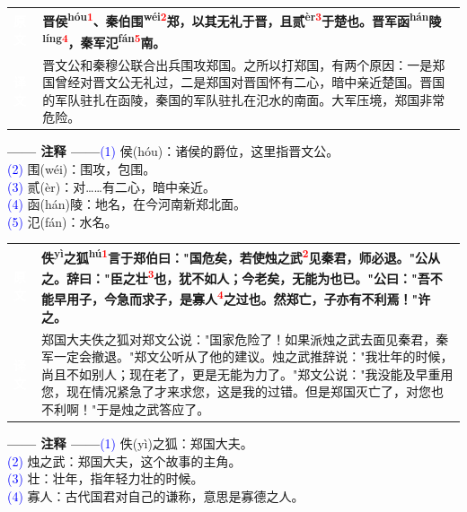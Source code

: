 \documentclass[a4paper,12pt]{ctexart}
\makeatletter
\newcommand{\ruby}[2]{#1\textsuperscript{#2}}
\newlength{\colA}\setlength{\colA}{0.06\textwidth}
\newlength{\colB}\setlength{\colB}{0.64\textwidth}
\newlength{\colC}\setlength{\colC}{0.26\textwidth}
\newcommand{\sectab}[3]{%
  \noindent
  \begin{minipage}[c]{\dimexpr\colA+\colB+2\tabcolsep\relax}
  \begin{tabular}{@{}p{\colA}p{\colB}@{}}
  \sideyuan  & {\large\bfseries #1} \\
  \sideyiwen & {\large #2} \\
  \end{tabular}
  \end{minipage}
  \hfill
  \begin{minipage}[c]{\colC}
  {\labelann\vspace{0.1cm}}#3
  \end{minipage}
  \par
}
\newcommand{\sideyuan}{\colorbox{blue!70!black}{\textcolor{white}{\normalsize\textbf{原文}}}}
\newcommand{\sideyiwen}{\colorbox{green!60!black}{\textcolor{white}{\normalsize\textbf{译文}}}}
\newcommand{\labelann}{\textcolor{orange!80!black}{\small\textbf{—— 注释 ——}}}
\newcommand{\refmark}[1]{\textsuperscript{\textcolor{red}{#1}}}
\makeatother
\begin{document}
\vspace{0.3cm}
\sectab{晋\ruby{侯}{hóu}\refmark{1}、秦伯\ruby{围}{wéi}\refmark{2}郑，以其无礼于晋，且\ruby{贰}{èr}\refmark{3}于楚也。晋军\ruby{函}{hán}\ruby{陵}{líng}\refmark{4}，秦军\ruby{氾}{fán}\refmark{5}南。}{晋文公和秦穆公联合出兵围攻郑国。之所以打郑国，有两个原因：一是郑国曾经对晋文公无礼过，二是郑国对晋国怀有二心，暗中亲近楚国。晋国的军队驻扎在函陵，秦国的军队驻扎在氾水的南面。大军压境，郑国非常危险。}{{\small \textcolor{blue}{(1)} 侯(hóu)：诸侯的爵位，这里指晋文公。}\\[0.1cm]{\small \textcolor{blue}{(2)} 围(wéi)：围攻，包围。}\\[0.1cm]{\small \textcolor{blue}{(3)} 贰(èr)：对……有二心，暗中亲近。}\\[0.1cm]{\small \textcolor{blue}{(4)} 函(hán)陵：地名，在今河南新郑北面。}\\[0.1cm]{\small \textcolor{blue}{(5)} 氾(fán)：水名。}}

\vspace{0.3cm}
\sectab{\ruby{佚}{yì}之\ruby{狐}{hú}\refmark{1}言于郑伯曰："国危矣，若使烛之武\refmark{2}见秦君，师必退。"公从之。辞曰："臣之壮\refmark{3}也，犹不如人；今老矣，无能为也已。"公曰："吾不能早用子，今急而求子，是寡人\refmark{4}之过也。然郑亡，子亦有不利焉！"许之。}{郑国大夫佚之狐对郑文公说："国家危险了！如果派烛之武去面见秦君，秦军一定会撤退。"郑文公听从了他的建议。烛之武推辞说："我壮年的时候，尚且不如别人；现在老了，更是无能为力了。"郑文公说："我没能及早重用您，现在情况紧急了才来求您，这是我的过错。但是郑国灭亡了，对您也不利啊！"于是烛之武答应了。}{{\small \textcolor{blue}{(1)} 佚(yì)之狐：郑国大夫。}\\[0.1cm]{\small \textcolor{blue}{(2)} 烛之武：郑国大夫，这个故事的主角。}\\[0.1cm]{\small \textcolor{blue}{(3)} 壮：壮年，指年轻力壮的时候。}\\[0.1cm]{\small \textcolor{blue}{(4)} 寡人：古代国君对自己的谦称，意思是寡德之人。}}
\end{document}
